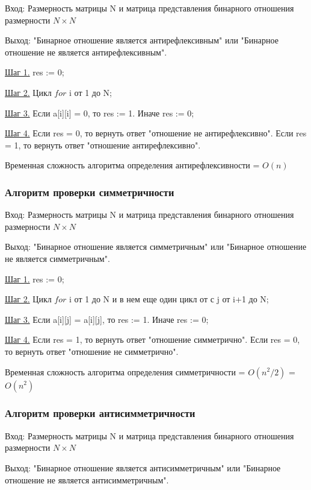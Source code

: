 \documentclass[bachelor, och, labwork]{shiza}
\begin{document}
	$\textit{Вход:}$ Размерность матрицы N и матрица представления бинарного отношения размерности $N \times N$
	
	$\textit{Выход:}$  "Бинарное отношение является антирефлексивным" или "Бинарное отношение не является антирефлексивным".
	
	\underline{Шаг 1.} res := 0;

	\underline{Шаг 2.} Цикл $for$ i от 1 до N;
	
	\underline{Шаг 3.} Если a[i][i] = 0, то res := 1. Иначе res := 0;
	
	\underline{Шаг 4.} Если res = 0, то вернуть ответ "отношение не антирефлексивно". Если res = 1, то вернуть ответ "отношение антирефлексивно".
	
	Временная сложность алгоритма определения антирефлексивности = $O(n)$
		
	\subsubsection{Алгоритм проверки симметричности}
	
	$\textit{Вход:}$ Размерность матрицы N и матрица представления бинарного отношения размерности $N \times N$
	
	$\textit{Выход:}$ "Бинарное отношение является симметричным" или "Бинарное отношение не является симметричным".
	
	\underline{Шаг 1.} res := 0;
	
	\underline{Шаг 2.} Цикл $for$ i от 1 до N и в нем еще один цикл от с j от i+1 до N;
	
	\underline{Шаг 3.} Если a[i][j] = a[i][j], то res := 1. Иначе res := 0;
	
	\underline{Шаг 4.} Если res = 1, то вернуть ответ "отношение симметрично". Если res = 0, то вернуть ответ "отношение не симметрично".
	
	Временная сложность алгоритма определения симметричности = $O(n^2/2)$ = $O(n^2)$
	
	\subsubsection{Алгоритм проверки антисимметричности}
	
	$\textit{Вход:}$ Размерность матрицы N и матрица представления бинарного отношения размерности $N \times N$
	
	$\textit{Выход:}$  "Бинарное отношение является антисимметричным" или "Бинарное отношение не является антисимметричным".
	
\end{document}

